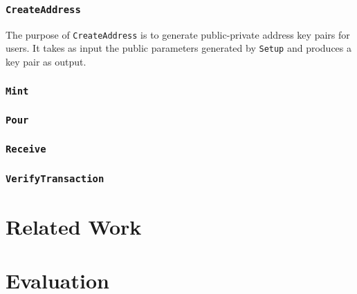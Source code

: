 \documentclass{article}
\begin{document}
\subsubsection{\texttt{CreateAddress}}
The purpose of \texttt{CreateAddress} is to generate public-private address key pairs for users. It takes as input the public parameters generated by \texttt{Setup} and produces a key pair as output.

\subsubsection{\texttt{Mint}}
\subsubsection{\texttt{Pour}}
\subsubsection{\texttt{Receive}}
\subsubsection{\texttt{VerifyTransaction}}

\section{Related Work}
\section{Evaluation}

\newpage
\printbibliography
\end{document}
